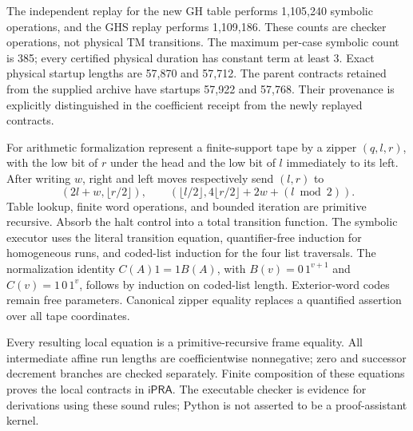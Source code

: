 \documentclass[11pt]{article}
\newcommand{\ipra}{\ensuremath{\mathsf{iPRA}}}
\begin{document}
The independent replay for the new GH table performs 1,105,240 symbolic
operations, and the GHS replay performs 1,109,186. These counts are
checker operations, not physical TM transitions. The maximum per-case
symbolic count is 385; every certified physical duration has constant
term at least 3. Exact physical startup lengths are 57,870 and 57,712.
The parent contracts retained from the supplied archive have startups
57,922 and 57,768. Their provenance is explicitly distinguished in the
coefficient receipt from the newly replayed contracts.

For arithmetic formalization represent a finite-support tape by a
zipper $(q,l,r)$, with the low bit of $r$ under the head and the low bit
of $l$ immediately to its left. After writing $w$, right and left moves
respectively send $(l,r)$ to
\[
 (2l+w,\lfloor r/2\rfloor),\qquad
 (\lfloor l/2\rfloor,4\lfloor r/2\rfloor+2w+(l\bmod2)).
\]
Table lookup, finite word operations, and bounded iteration are primitive
recursive. Absorb the halt control into a total transition function.
The symbolic executor uses the literal transition equation, quantifier-free
induction for homogeneous runs, and coded-list induction for the four
list traversals. The normalization identity
$C(A)1=1B(A)$, with $B(v)=0\,1^{v+1}$ and $C(v)=1\,0\,1^v$,
follows by induction on coded-list length. Exterior-word codes remain
free parameters. Canonical zipper equality replaces a quantified
assertion over all tape coordinates.

Every resulting local equation is a primitive-recursive frame equality.
All intermediate affine run lengths are coefficientwise nonnegative;
zero and successor decrement branches are checked separately. Finite
composition of these equations proves the local contracts in \ipra.
The executable checker is evidence for derivations using these sound
rules; Python is not asserted to be a proof-assistant kernel.
\end{document}

